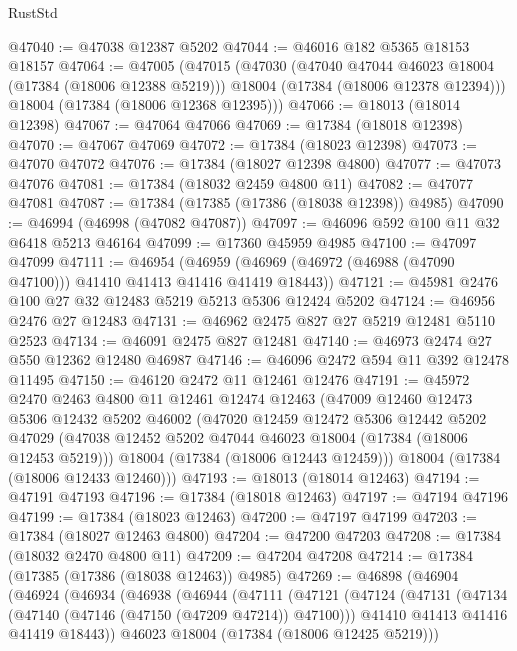 \begin{lexlean}{RustStd}
\begin{coremodule}
@47040 := @47038 @12387 @5202
@47044 := @46016 @182 @5365 @18153 @18157
@47064 := @47005
    (@47015
      (@47030
        (@47040 @47044 @46023 @18004 (@17384 (@18006 @12388 @5219)))
        @18004
        (@17384 (@18006 @12378 @12394)))
      @18004
      (@17384 (@18006 @12368 @12395)))
@47066 := @18013 (@18014 @12398)
@47067 := @47064 @47066
@47069 := @17384 (@18018 @12398)
@47070 := @47067 @47069
@47072 := @17384 (@18023 @12398)
@47073 := @47070 @47072
@47076 := @17384 (@18027 @12398 @4800)
@47077 := @47073 @47076
@47081 := @17384 (@18032 @2459 @4800 @11)
@47082 := @47077 @47081
@47087 := @17384 (@17385 (@17386 (@18038 @12398)) @4985)
@47090 := @46994 (@46998 (@47082 @47087))
@47097 := @46096 @592 @100 @11 @32 @6418 @5213 @46164
@47099 := @17360 @45959 @4985
@47100 := @47097 @47099
@47111 := @46954
    (@46959 (@46969 (@46972 (@46988 (@47090 @47100))) @41410 @41413 @41416 @41419 @18443))
@47121 := @45981 @2476 @100 @27 @32 @12483 @5219 @5213 @5306 @12424 @5202
@47124 := @46956 @2476 @27 @12483
@47131 := @46962 @2475 @827 @27 @5219 @12481 @5110 @2523
@47134 := @46091 @2475 @827 @12481
@47140 := @46973 @2474 @27 @550 @12362 @12480 @46987
@47146 := @46096 @2472 @594 @11 @392 @12478 @11495
@47150 := @46120 @2472 @11 @12461 @12476
@47191 := @45972
    @2470
    @2463
    @4800
    @11
    @12461
    @12474
    @12463
    (@47009
      @12460
      @12473
      @5306
      @12432
      @5202
      @46002
      (@47020
        @12459
        @12472
        @5306
        @12442
        @5202
        @47029
        (@47038 @12452 @5202 @47044 @46023 @18004 (@17384 (@18006 @12453 @5219)))
        @18004
        (@17384 (@18006 @12443 @12459)))
      @18004
      (@17384 (@18006 @12433 @12460)))
@47193 := @18013 (@18014 @12463)
@47194 := @47191 @47193
@47196 := @17384 (@18018 @12463)
@47197 := @47194 @47196
@47199 := @17384 (@18023 @12463)
@47200 := @47197 @47199
@47203 := @17384 (@18027 @12463 @4800)
@47204 := @47200 @47203
@47208 := @17384 (@18032 @2470 @4800 @11)
@47209 := @47204 @47208
@47214 := @17384 (@17385 (@17386 (@18038 @12463)) @4985)
@47269 := @46898
    (@46904
      (@46924
        (@46934
          (@46938
            (@46944
              (@47111
                (@47121
                  (@47124
                    (@47131
                      (@47134 (@47140 (@47146 (@47150 (@47209 @47214)) @47100)))
                      @41410
                      @41413
                      @41416
                      @41419
                      @18443))
                  @46023
                  @18004
                  (@17384 (@18006 @12425 @5219)))

\end{coremodule}
\end{lexlean}
